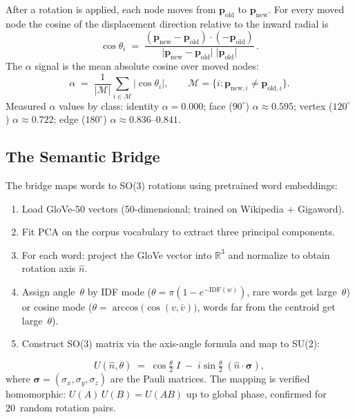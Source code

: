 \documentclass{article}
\begin{document}
After a rotation is applied, each node moves from $\mathbf{p}_{\mathrm{old}}$ to $\mathbf{p}_{\mathrm{new}}$.  For every moved node the cosine of the displacement direction relative to the inward radial is
\begin{equation}
  \cos\theta_{i}
  \;=\;
  \frac{(\mathbf{p}_{\mathrm{new}}-\mathbf{p}_{\mathrm{old}})
        \cdot(-\mathbf{p}_{\mathrm{old}})}
       {\lvert\mathbf{p}_{\mathrm{new}}-\mathbf{p}_{\mathrm{old}}\rvert
        \;\lvert\mathbf{p}_{\mathrm{old}}\rvert}\,.
\end{equation}
The $\alpha$ signal is the mean absolute cosine over moved nodes:
\begin{equation}
  \alpha
  \;=\;
  \frac{1}{\lvert\mathcal{M}\rvert}
  \sum_{i\in\mathcal{M}} \lvert\cos\theta_{i}\rvert,
  \qquad
  \mathcal{M}=\{i:\mathbf{p}_{\mathrm{new},i}\neq\mathbf{p}_{\mathrm{old},i}\}.
\end{equation}
Measured $\alpha$ values by class: identity $\alpha=0.000$; face ($90^{\circ}$) $\alpha\approx0.595$; vertex ($120^{\circ}$) $\alpha\approx0.722$; edge ($180^{\circ}$) $\alpha\approx0.836$--$0.841$.

\subsection{The Semantic Bridge}

The bridge maps words to SO(3) rotations using pretrained word embeddings:

\begin{enumerate}[nosep,leftmargin=*]
  \item Load GloVe-50 vectors (50-dimensional; trained on Wikipedia + Gigaword).
  \item Fit PCA on the corpus vocabulary to extract three principal components.
  \item For each word: project the GloVe vector into $\mathbb{R}^{3}$ and normalize to obtain rotation axis $\hat{n}$.
  \item Assign angle~$\theta$ by IDF mode ($\theta=\pi(1-e^{-\mathrm{IDF}(w)})$, rare words get large~$\theta$) or cosine mode ($\theta=\arccos\!\bigl(\cos(v,\bar{v})\bigr)$, words far from the centroid get large~$\theta$).
  \item Construct SO(3) matrix via the axis-angle formula and map to SU(2):
\end{enumerate}
\begin{equation}
  U(\hat{n},\theta)
  \;=\;
  \cos\!\tfrac{\theta}{2}\;\!I
  \;-\;
  i\sin\!\tfrac{\theta}{2}\;(\hat{n}\cdot\boldsymbol{\sigma}),
  \label{eq:su2}
\end{equation}
where $\boldsymbol{\sigma}=(\sigma_{x},\sigma_{y},\sigma_{z})$ are the Pauli matrices.  The mapping is verified homomorphic: $U(A)\,U(B)=U(AB)$ up to global phase, confirmed for 20~random rotation pairs.
\end{document}
